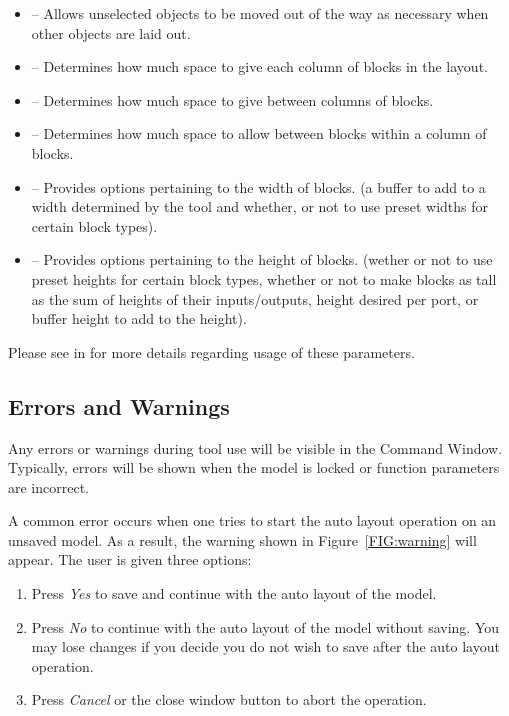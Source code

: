 \documentclass{article}
\newcommand{\toolFolder}{\cmd{AutoLayout}}
\begin{document}
\begin{itemize}
  \item {} -- Allows unselected objects to be moved out of the way as necessary when other objects are laid out.
  \item {} -- Determines how much space to give each column of blocks in the layout.
  \item {} -- Determines how much space to give between columns of blocks.
  \item {} -- Determines how much space to allow between blocks within a column of blocks.
  \item {} -- Provides options pertaining to the width of blocks. (\eg a buffer to add to a width determined by the tool and whether, or not to use preset widths for certain block types).
  \item {} -- Provides options pertaining to the height of blocks. (\eg wether or not to use preset heights for certain block types, whether or not to make blocks as tall as the sum of heights of their inputs/outputs, height desired per port, or buffer height to add to the height).
\end{itemize}

Please see  in \file{\toolFolder\textbackslash src} for more details regarding usage of these parameters.

\subsection{Errors and Warnings}
\label{sec:errorwarning}
Any errors or warnings during tool use will be visible in the \Matlab Command Window. Typically, errors will be shown when the model is locked or function parameters are incorrect.

A common error occurs when one tries to start the auto layout operation on an unsaved model. As a result, the warning shown in Figure~\ref{FIG:warning} will appear. The user is given three options:
\begin{enumerate}
	\item Press \emph{Yes} to save and continue with the auto layout of the model.
	\item Press \emph{No} to continue with the auto layout of the model without saving. You may lose changes if you decide you do not wish to save after the auto layout operation.
	\item Press \emph{Cancel} or the close window button to abort the operation.
\end{enumerate}
\end{document}
